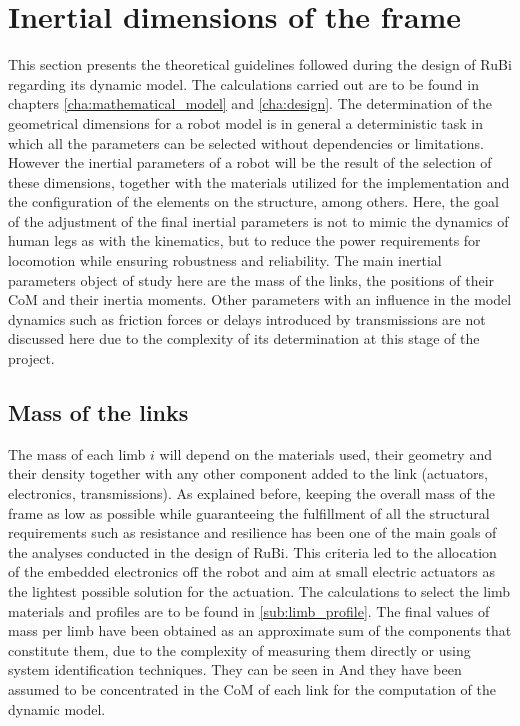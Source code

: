 
\section{Inertial dimensions of the frame} %
\label{sec:physical_properties}
This section presents the theoretical guidelines followed during the design of RuBi regarding its dynamic model.
The calculations carried out are to be found in chapters \ref{cha:mathematical_model} and \ref{cha:design}. 
The determination of the geometrical dimensions for a robot model is in general a deterministic task in which all the parameters can be selected without dependencies or limitations.
However the inertial parameters of a robot will be the result of the selection of these dimensions, together with the materials utilized for the implementation and the configuration of the elements on the structure, among others.
Here, the goal of the adjustment of the final inertial parameters is not to mimic the dynamics of human legs as with the kinematics, but to reduce the power requirements for locomotion while ensuring robustness and reliability.
The main inertial parameters object of study here are the mass of the links, the positions of their CoM and their inertia moments.
Other parameters with an influence in the model dynamics such as friction forces or delays introduced by transmissions are not discussed here due to the complexity of its determination at this stage of the project.

\subsection{Mass of the links} %
\label{sub:mass_of_the_limbs}
The mass of each limb $i$ will depend on the materials used, their geometry and their density together with any other component added to the link (actuators, electronics, transmissions).
As explained before, keeping the overall mass of the frame as low as possible while guaranteeing the fulfillment of all the structural requirements such as resistance and resilience has been one of the main goals of the analyses conducted in the design of RuBi.
This criteria led to the allocation of the embedded electronics off the robot and aim at small electric actuators as the lightest possible solution for the actuation. 
The calculations to select the limb materials and profiles are to be found in \ref{sub:limb_profile}.
The final values of mass per limb have been obtained as an approximate sum of the components that constitute them, due to the complexity of measuring them directly or using system identification techniques. 
They can be seen in %
And they have been assumed to be concentrated in the CoM of each link for the computation of the dynamic model.

